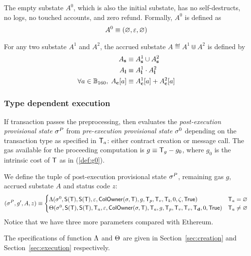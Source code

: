 The empty substate $A^0$, which is also the initial substate, has no self-destructs, no logs, no touched accounts, and zero refund. Formally, $A^0$ is defined as
\begin{align}
	A^0\equiv \left( \varnothing, \mathbb{\varepsilon}, \varnothing\right)
\end{align}

For any two substate $A^1$ and $A^2$, the accrued substate $A\eqdef A^1\Cup A^2$ is defined by 
\begin{align}
	A_{\bf s} &\equiv A^1_{\bf s} \cup A^2_{\bf s} \\ 
	A_{\bf l} &\equiv A^1_{\bf l} \cdot A^2_{\bf l} \\
	\forall a\in\mathbb{B}_{160},\; A_{\bf c}[a] & \equiv A^1_{\bf c}[a]+A^2_{\bf c}[a]
\end{align}


\subsubsection{Type dependent execution}

If transaction passes the preprocessing, 
then {\name} evaluates the \emph{post-execution provisional state} $\mathbf{\sigma}^P$ from \emph{pre-execution provisional state} $\mathbf{\sigma}^0$ depending on the transaction type as specified in $\textsf{T}_a$: either contract creation or message call. 
%
The gas available for the proceeding computation is $g\equiv \textsf{T}_g-g_0$, where $g_0$ is the intrinsic cost of $\textsf{T}$ as in (\ref{def:g0}). 

We define the tuple of post-execution provisional state $\mathbf{\sigma}^{P}$, remaining gas $g$, accrued substate $A$ and status code $z$:
\begin{align}\label{def:transform}
	(\mathbf{\sigma}^{P},g',A,z)\equiv
	\begin{cases}
		\mathrm{\Lambda}(\mathbf{\sigma}^0,\mathsf{S}{\left({\textsf{T}} \right)},\mathsf{S}{\left({\textsf{T}} \right)},\mathbb{\varepsilon}, \mathsf{ColOwner}(\mathbf{\sigma},\textsf{T}),g,\textsf{T}_p,\textsf{T}_v,\textsf{T}_{\bf i},0,\zeta,\mathsf{True}) &  \textsf{T}_a=\varnothing \\
		\mathrm{\Theta}(\mathbf{\sigma}^0,\mathsf{S}{\left({\textsf{T}} \right)},\mathsf{S}{\left({\textsf{T}} \right)},\textsf{T}_a,\mathbb{\varepsilon},\mathsf{ColOwner}(\mathbf{\sigma},\textsf{T}),\textsf{T}_a,g,\textsf{T}_p,\textsf{T}_v,\textsf{T}_v,\textsf{T}_{\bf d},0,\mathsf{True}) & \textsf{T}_a\neq\varnothing
	\end{cases}
\end{align}
%
Notice that we have three more parameters compared with Ethereum. 

The specifications of function $\mathrm{\Lambda}$ and $\mathrm{\Theta}$ are given in Section~\ref{sec:creation} and Section~\ref{sec:execution} respectively.

